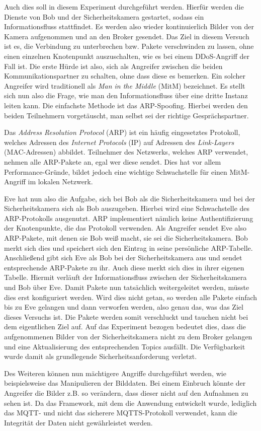 Auch dies soll in diesem Experiment durchgeführt werden. Hierfür werden die
Dienste von Bob und der Sicherheitskamera gestartet, sodass ein
Informationsfluss stattfindet. Es werden also wieder kontinuierlich Bilder von
der Kamera aufgenommen und an den Broker gesendet. Das Ziel in diesem Versuch
ist es, die Verbindung zu unterbrechen bzw. Pakete verschwinden zu lassen, ohne
einen einzelnen Knotenpunkt auszuschalten, wie es bei einem DDoS-Angriff der
Fall ist. Die erste Hürde ist also, sich als Angreifer zwischen die beiden
Kommunikationspartner zu schalten, ohne dass diese es bemerken. Ein solcher
Angreifer wird traditionell als \textit{Man in the Middle} (MitM) bezeichnet. Es
stellt sich nun also die Frage, wie man den Informationsfluss über eine dritte
Instanz leiten kann. Die einfachste Methode ist das ARP-Spoofing. Hierbei werden
den beiden Teilnehmern vorgetäuscht, man selbst sei der richtige
Gesprächspartner.

Das \textit{Address Resolution Protocol} (ARP) ist ein häufig eingesetztes
Protokoll, welches Adressen des \textit{Internet Protocols} (IP) auf Adressen
des \textit{Link-Layers} (MAC-Adressen) abbildet. Teilnehmer des Netzwerks,
welches ARP verwendet, nehmen alle ARP-Pakete an, egal wer diese sendet. Dies
hat vor allem Performance-Gründe, bildet jedoch eine wichtige Schwachstelle für
einen MitM-Angriff im lokalen Netzwerk.

Eve hat nun also die Aufgabe, sich bei Bob als die Sicherheitskamera und bei der
Sicherheitskamera sich als Bob auszugeben. Hierbei wird eine Schwachstelle des
ARP-Protokolls ausgenutzt. ARP implementiert nämlich keine Authentifizierung der
Knotenpunkte, die das Protokoll verwenden. Als Angreifer sendet Eve also
ARP-Pakete, mit denen sie Bob weiß macht, sie sei die Sicherheitskamera. Bob
merkt sich dies und speichert sich den Eintrag in seine persönliche ARP-Tabelle.
Anschließend gibt sich Eve als Bob bei der Sicherheitskamera aus und sendet
entsprechende ARP-Pakete zu ihr. Auch diese merkt sich dies in ihrer eigenen
Tabelle. Hiermit verläuft der Informationsfluss zwischen der Sicherheitskamera
und Bob über Eve. Damit Pakete nun tatsächlich weitergeleitet werden, müsste
dies erst konfiguriert werden. Wird dies nicht getan, so werden alle Pakete
einfach bis zu Eve gelangen und dann verworfen werden, also genau das, was das
Ziel dieses Versuchs ist. Die Pakete werden somit verschluckt und tauchen nicht
bei dem eigentlichen Ziel auf. Auf das Experiment bezogen bedeutet dies, dass
die aufgenommenen Bilder von der Sicherheitskamera nicht zu dem Broker gelangen
und eine Aktualisierung des entsprechenden Topics ausfällt. Die Verfügbarkeit
wurde damit als grundlegende Sicherheitsanforderung verletzt.

Des Weiteren können nun mächtigere Angriffe durchgeführt werden, wie
beispielsweise das Manipulieren der Bilddaten. Bei einem Einbruch könnte der
Angreifer die Bilder z.B. so verändern, dass dieser nicht auf den Aufnahmen zu
sehen ist. Da das Framework, mit dem die Anwendung entwickelt wurde, lediglich
das MQTT- und nicht das sicherere MQTTS-Protokoll verwendet, kann die Integrität
der Daten nicht gewährleistet werden.
